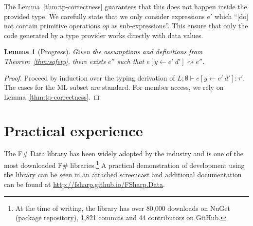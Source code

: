 \documentclass[10pt,preprint,blind,clearpagebib]{sigplanconf}
\newcommand{\reduce}{\rightsquigarrow}
\newtheorem{lemma}[theorem]{Lemma}
\begin{document}
The Lemma~\ref{thm:tp-correctness} guarantees that this does not happen inside the provided type.
We carefully state that we only consider expressions $e'$ which 
``[do] not contain primitive operations $op$ as sub-expressions''. This ensure that only
the code generated by a type provider works directly with data values.

\begin{lemma}[Progress]
\label{thm:rs-progress}
Given the assumptions and definitions from Theorem~\ref{thm:safety}, there exists $e''$ such that
$e[y\leftarrow e'~d'] \reduce e''$.
\end{lemma}
\begin{proof}
Proceed by induction over the typing derivation of $L; \emptyset \vdash e[y\leftarrow e'~d'] : \tau'$. 
The cases for the ML subset are standard. For member access, we rely on Lemma~\ref{thm:tp-correctness}.
\end{proof}



%
%

\section{Practical experience}
\label{sec:impl}

The F\# Data library has been widely adopted by the industry and is one of the most downloaded
F\# libraries.\footnote{At the time of writing, the library has over 80,000 downloads on NuGet 
(package repository), 1,821 commits and 44 contributors on GitHub.} A practical demonstration of 
development using the library can be seen in an attached screencast and additional documentation can be
found at \url{http://fsharp.github.io/FSharp.Data}.
\end{document}
